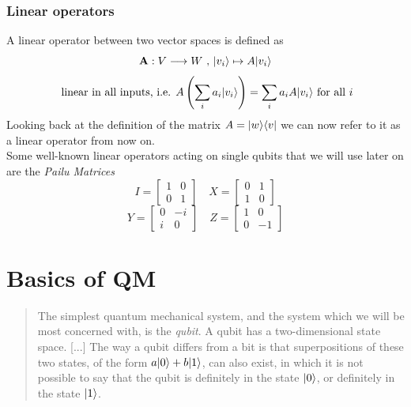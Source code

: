 	\subsubsection*{Linear operators}
	A linear operator between two vector spaces is defined as 
	$$ \mathbf{A}: V\longrightarrow W \text{  ,  }|v_i \rangle\mapsto A|v_i \rangle$$
	$$ \text{ linear in all inputs, i.e.  }  A\left( \sum_i a_i|v_i \rangle\right) = \sum_i a_i A|v_i \rangle \text{  for all } i $$ 
	Looking back at the definition of the matrix $ A = |w \rangle\langle v|$ we can now refer to it as a linear operator from now on. \\
	Some well-known linear operators acting on single qubits that we will use later on are the \textit{Pailu Matrices}
	$$ I = \begin{bmatrix} 1 & 0 \\ 0 & 1 \end{bmatrix}	 \quad   X = \begin{bmatrix} 0 & 1 \\ 1 & 0 \end{bmatrix}$$
	$$ Y= \begin{bmatrix} 0 & -i \\ i & 0 \end{bmatrix}	 \quad   Z = \begin{bmatrix} 1 & 0 \\ 0 & -1 \end{bmatrix}$$
	
	\section{Basics of QM}
	\begin{quotation}
		The simplest quantum mechanical system, and the system which we will be most concerned with, is the \emph{qubit}. A qubit has a two-dimensional state space. [...] 
		The way a qubit differs from a bit is that superpositions of these two states, of the form $a|0 \rangle + b|1 \rangle$, can also exist, in which it is not possible to say that the qubit is definitely in the state $|0 \rangle$, or definitely in the state $|1 \rangle$.
		\cite{NC10}
	\end{quotation}
	

